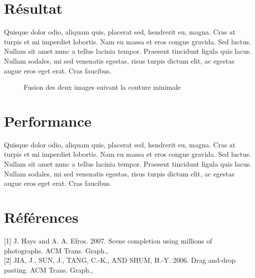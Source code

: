 \documentclass[a4paper]{article}
\begin{document}
\section{Résultat}

Quisque dolor odio, aliquam quis, placerat sed, hendrerit eu, magna. Cras at
turpis et mi imperdiet lobortis. Nam eu massa et eros congue gravida. Sed
luctus. Nullam sit amet nunc a tellus lacinia tempor. Praesent tincidunt ligula
quis lacus. Nullam sodales, mi sed venenatis egestas, risus turpis dictum elit,
ac egestas augue eros eget erat. Cras faucibus.

\begin{figure}[!ht]%
    \centering
    \hspace{0.030\textwidth}
    \caption{Fusion des deux images suivant la couture minimale}
    \label{results}
\end{figure}

\section{Performance}

Quisque dolor odio, aliquam quis, placerat sed, hendrerit eu, magna. Cras at
turpis et mi imperdiet lobortis. Nam eu massa et eros congue gravida. Sed
luctus. Nullam sit amet nunc a tellus lacinia tempor. Praesent tincidunt ligula
quis lacus. Nullam sodales, mi sed venenatis egestas, risus turpis dictum elit,
ac egestas augue eros eget erat. Cras faucibus.

\section{Références}

[1] J. Hays and A. A. Efros.  2007. Scene completion using millions of photographs. ACM Trans. Graph.,
\\

[2] JIA, J., SUN, J., TANG, C.-K., AND SHUM, H.-Y. 2006. Drag and-drop pasting. ACM Trans. Graph.,
\end{document}
